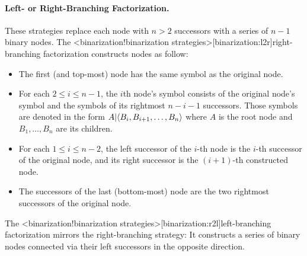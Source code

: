 \documentclass[../../document.tex]{subfiles}
\begin{document}

    \paragraph{Left- or Right-Branching Factorization.}
    These strategies replace each node with \( n>2 \) successors with a series of \( n-1 \) binary nodes.
    The <binarization!binarization strategies>[binarization:l2r]{right-branching factorization} constructs nodes as follow:
    \begin{itemize}
        \item The first (and top-most) node has the same symbol as the original node.
        \item For each \(2 \leq i \leq n-1\), the \(i\)th node's symbol consists of the original node's symbol and the symbols of its rightmost \(n-i-1\) successors. Those symbols are denoted in the form \({A}|\!\left<{B_i,B_{i+1},\ldots,B_n}\right>\) where \(A\) is the root node and \(B_1, \ldots, B_n\) are its children.
        \item For each \(1 \leq i \leq n-2\), the left successor of the \(i\)-th node is the \(i\)-th successor of the original node, and its right successor is the \((i+1)\)-th constructed node.
        \item The successors of the last (bottom-most) node are the two rightmost successors of the original node.
    \end{itemize}
    The <binarization!binarization strategies>[binarization:r2l]{left-branching factorization} mirrors the right-branching strategy: It constructs a series of binary nodes connected via their left successors in the opposite direction.
\end{document}
